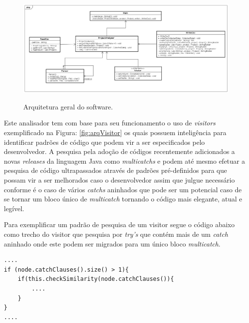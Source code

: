 \begin{figure}[h]
	\center
	\includegraphics[scale=0.3]{Imagens/Arquitetura}
	\label{fig:arqGeral}
	\caption{Arquitetura geral do software.}
\end{figure}

Este analisador tem com base para seu funcionamento o uso de {\it visitors} \cite{Gamma:1995:DPE:186897} exemplificado na Figura: \ref{fig:arqVisitor} os quais possuem inteligência para identificar padrões de código que podem vir a ser especificados pelo desenvolvedor. A pesquisa pela adoção de códigos recentemente adicionados a novas {\it releases} da linguagem Java como {\it multicatchs} e podem até mesmo efetuar a pesquisa de código ultrapassados através de padrões pré-definidos para que possam vir a ser melhorados caso o desenvolvedor assim que julgue necessário conforme é o caso de vários {\it catchs} aninhados que pode ser um potencial caso de se tornar um bloco único de {\it multicatch} tornando o código mais elegante, atual e legível.

Para exemplificar um padrão de pesquisa de um visitor segue o código abaixo como trecho do visitor que pesquisa por \textit{try's} que contém mais de um \textit{catch} aninhado onde este podem ser migrados para um único bloco \textit{multicatch}. 
\begin{lstlisting}
....
if (node.catchClauses().size() > 1){
	if(this.checkSimilarity(node.catchClauses()){
		....
	}
}
....
\end{lstlisting}


